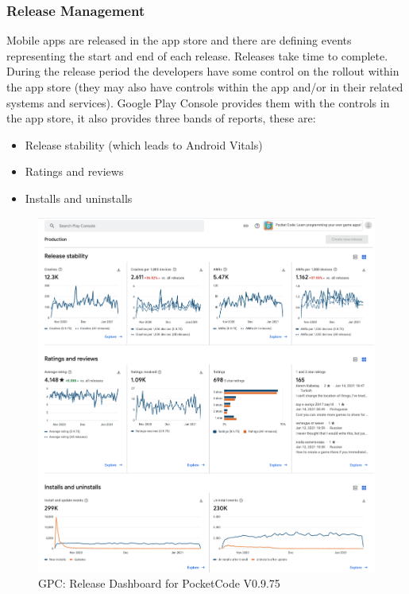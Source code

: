 \subsubsection{Release Management}
Mobile apps are released in the app store and there are defining events representing the start and end of each release. Releases take time to complete. During the release period the developers have some control on the rollout within the app store (they may also have controls within the app and/or in their related systems and services). Google Play Console provides them with the controls in the app store, it also provides three bands of reports, these are:

\begin{itemize}
    \item Release stability (which leads to Android Vitals)
    \item Ratings and reviews
    \item Installs and uninstalls
\end{itemize}

\begin{figure}
    \centering
    \includegraphics[width=12cm]{images/google-play-console/gpc-release-dashboard-pocketcode-v0.9.75-on2021-01-15.png}
    \caption{GPC: Release Dashboard for PocketCode V0.9.75}
    \label{fig:gpc-release-dashboard-pocketcode-v0.9.75}
\end{figure}

